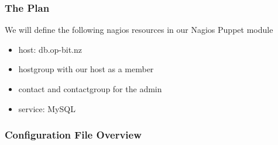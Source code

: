 \documentclass[10pt]{beamer}
\begin{document}
\begin{frame}
  \frametitle{The Plan}
  
  We will define the following nagios resources in our Nagios Puppet module
\begin{itemize}
\item host:  db.op-bit.nz
\item hostgroup with our host as a member
\item contact and contactgroup for the admin
\item service:  MySQL
\end{itemize}
\end{frame}

\begin{frame}
\frametitle{Configuration File Overview}
\hspace{-2cm}

\vspace*{\fill}

\noindent
{}%

\vspace*{2cm}

\end{frame}
\end{document}
